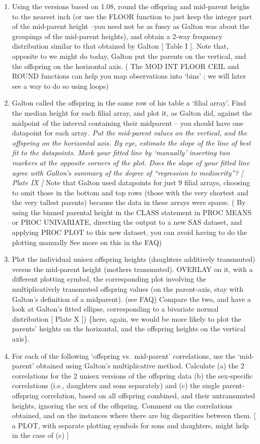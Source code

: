 \documentclass[]{book}
\begin{document}
\begin{enumerate}
\item
  Using the versions based on 1.08, round the offspring and mid-parent heighs to the nearest inch (or use the FLOOR function to just keep the integer part of the mid-parent height --you need not be as fussy as Galton was about the groupings of the mid-parent heights), and obtain a 2-way frequency distribution similar to that obtained by Galton {[} Table I {]}. Note that, opposite to we might do today, Galton put the parents on the vertical, and the offspring on the horizontal axis. ( The MOD INT FLOOR CEIL and ROUND functions can help you map observations into `bins' ; we will later see a way to do so using loops)
\item
  Galton called the offspring in the same row of his table a `filial array'. Find the median height for each filial array, and plot it, as Galton did, against the midpoint of the interval containing their midparent -- you should have one datapoint for each array\emph{. Put the mid-parent values on the vertical, and the offspring on the horizontal axis. By eye, estimate the slope of the line of best fit to the datapoints. Mark your fitted line by `manually' inserting two markers at the opposite corners of the plot. Does the slope of your fitted line agree with Galton's summary of the degree of ``regression to mediocrity''? {[} Plate IX {]} }Note that Galton used datapoints for just 9 filial arrays, choosing to omit those in the bottom and top rows (those with the very shortest and the very tallest parents) because the data in these arrays were sparse. ( By using the binned parental height in the CLASS statement in PROC MEANS or PROC UNIVARIATE, directing the output to a new SAS dataset, and applying PROC PLOT to this new dataset, you can avoid having to do the plotting manually See more on this in the FAQ)
\item
  Plot the individual unisex offspring heights (daughters additively transmuted) versus the mid-parent height (mothers transmuted). OVERLAY on it, with a different plotting symbol, the corresponding plot involving the multiplicatively transmuted offspring values (on the parent-axis, stay with Galton's definition of a midparent). (see FAQ) Compare the two, and have a look at Galton's fitted ellipse, corresponding to a bivariate normal distribution {[} Plate X {]}) \{here, again, we would be more likely to plot the parents' heights on the horizontal, and the offspring heights on the vertical axis\}.
\item
  For each of the following `offspring vs.~mid-parent' correlations, use the `mid-parent' obtained using Galton's multiplicative method. Calculate (a) the 2 correlations for the 2 unisex versions of the offspring data (b) the sex-specific correlations (i.e., daughters and sons separately) and (c) the single parent-offspring correlation, based on all offspring combined, and their untransmuted heights, ignoring the sex of the offspring. Comment on the correlations obtained, and on the instances where there are big disparities between them. {[} a PLOT, with separate plotting symbols for sons and daughters, might help in the case of (c) {]}

\end{enumerate}
\end{document}
